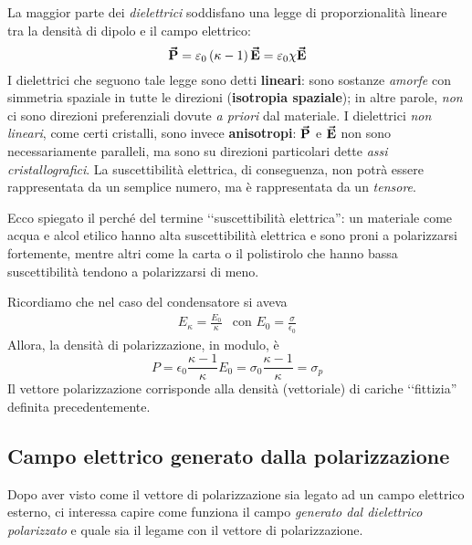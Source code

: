 La maggior parte dei \textit{dielettrici} soddisfano una legge di proporzionalità lineare tra la densità di dipolo e il campo elettrico:
\begin{equation}
	\vb*{\va{P}}=\varepsilon_0\left(\kappa-1\right)\vb*{\va{E}}=\varepsilon_0\chi\vb*{\va{E}}
\end{equation}
I dielettrici che seguono tale legge sono detti \textbf{lineari}: sono sostanze \textit{amorfe} con simmetria spaziale in tutte le direzioni (\textbf{isotropia spaziale}); in altre parole, \textit{non} ci sono direzioni preferenziali dovute \textit{a priori} dal materiale. I dielettrici \textit{non lineari}, come certi cristalli, sono invece \textbf{anisotropi}: $\vb*{\va{P}}$ e $\vb*{\va{E}}$ non sono necessariamente paralleli, ma sono su direzioni particolari dette \textit{assi cristallografici}. La suscettibilità elettrica, di conseguenza, non potrà essere rappresentata da un semplice numero, ma è rappresentata da un \textit{tensore}.
\begin{observe}
	Ecco spiegato il perché del termine ‘‘suscettibilità elettrica'': un materiale come acqua e alcol etilico hanno alta suscettibilità elettrica e sono proni a polarizzarsi fortemente, mentre altri come la carta o il polistirolo che hanno bassa suscettibilità tendono a polarizzarsi di meno. %
\end{observe}
\begin{example}
	Ricordiamo che nel caso del condensatore si aveva
	\begin{align*}
		E_{\kappa}=\frac{E_0}{\kappa}&\text{con } E_0=\frac{\sigma}{\epsilon_0 }
	\end{align*}
	Allora, la densità di polarizzazione, in modulo, è
	\begin{equation}
		P=\epsilon_0\frac{\kappa-1}{\kappa}E_0=\sigma_0\frac{\kappa-1}{\kappa}=\sigma_p
	\end{equation}
Il vettore polarizzazione corrisponde alla densità (vettoriale) di cariche ‘‘fittizia'' definita precedentemente.
\end{example}
\subsection{Campo elettrico generato dalla polarizzazione}
Dopo aver visto come il vettore di polarizzazione sia legato ad un campo elettrico esterno, ci interessa capire come funziona il campo \textit{generato dal dielettrico polarizzato} e quale sia il legame con il vettore di polarizzazione.
